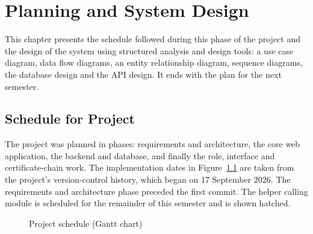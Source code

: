 \chapter{Planning and System Design}
This chapter presents the schedule followed during this phase of the project and the design of the system using structured analysis and design tools: a use case diagram, data flow diagrams, an entity relationship diagram, sequence diagrams, the database design and the API design. It ends with the plan for the next semester.

\section{Schedule for Project}
The project was planned in phases: requirements and architecture, the core web application, the backend and database, and finally the role, interface and certificate-chain work. The implementation dates in Figure~\ref{fig:gantt} are taken from the project's version-control history, which began on 17 September 2026. The requirements and architecture phase preceded the first commit. The helper calling module is scheduled for the remainder of this semester and is shown hatched.

\begin{figure}[!ht]
\centering
{}
\caption{Project schedule (Gantt chart)}
\label{fig:gantt}
\end{figure}

